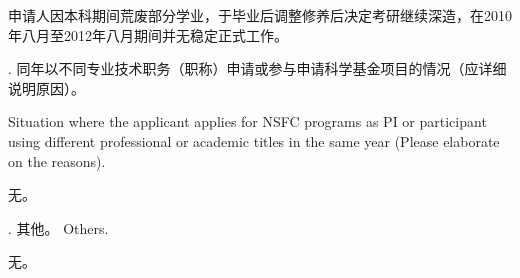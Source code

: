 \documentclass[12pt,UTF8,AutoFakeBold=4,a4paper]{ctexart}
\begin{document}
申请人因本科期间荒废部分学业，于毕业后调整修养后决定考研继续深造，在2010年八月至2012年八月期间并无稳定正式工作。

\bigskip

{\sihao \color{MsBlue} . 同年以不同专业技术职务（职称）申请或参与申请科学基金项目的情况（应详细说明原因）。 

\bigskip

\xiaosihao {} Situation where the applicant applies for NSFC programs as PI or participant using different professional or academic titles in the same year (Please elaborate on the reasons).}

\bigskip

无。

\bigskip

{\sihao \color{MsBlue} . 其他。 
\xiaosihao {} Others.}

\bigskip

无。

\bigskip
\end{document}

